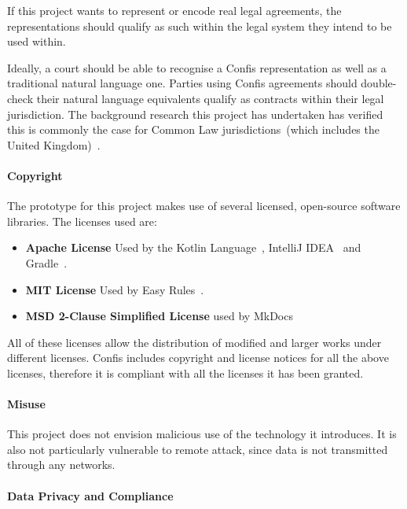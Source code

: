 If this project wants to represent or encode real legal agreements, the representations should qualify as such within the legal system they intend to be used within.

Ideally, a court should be able to recognise a Confis representation as well as a
traditional natural language one.
Parties using Confis agreements should double-check their natural language equivalents qualify as contracts within their legal jurisdiction.
The background research this project has undertaken has verified this is commonly the case for Common Law jurisdictions~(which includes the United Kingdom)~\cite{larsonContractLawIntro, contractDef2018precedent, contractDefinition}.

\paragraph{Copyright}\label{par:copyright}

The prototype for this project makes use of several licensed, open-source software
libraries.
The licenses used are:
\begin{itemize}
    \item \textbf{Apache License} Used by the Kotlin Language~\cite{kotlinLang}, IntelliJ IDEA~\cite{intelliJRepo} and Gradle~\cite{gradleDSL}.
    \item \textbf{MIT License} Used by Easy Rules~\cite{easyRules}.
    \item \textbf{MSD 2-Clause Simplified License} used by MkDocs~\cite{mkDocs}
\end{itemize}

All of these licenses allow the distribution of modified and larger works under different licenses.
Confis includes copyright and license notices for all the above licenses, therefore it is compliant with all the licenses it has been granted.

\paragraph{Misuse}\label{par:misuse}

This project does not envision malicious use of the technology it introduces.
It is also not particularly vulnerable to remote attack, since data is not transmitted through any networks.


\paragraph{Data Privacy and Compliance}\label{par:data-privacy-compliance}

